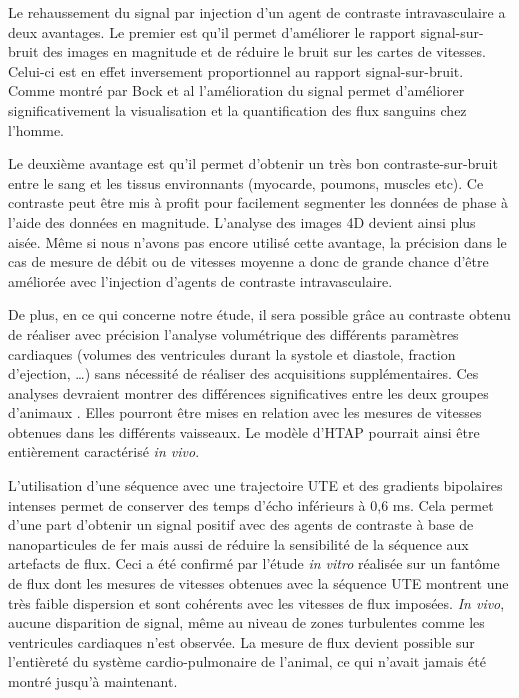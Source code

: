 Le rehaussement du signal par injection d’un agent de contraste intravasculaire a deux avantages. Le premier est qu’il permet d’améliorer le rapport signal-sur-bruit des images en magnitude et de réduire le bruit sur les cartes de vitesses. Celui-ci est en effet inversement proportionnel au rapport signal-sur-bruit. Comme montré par Bock et al \cite{Bock:2010aa} l’amélioration du signal permet d’améliorer significativement la visualisation et la quantification des flux sanguins chez l’homme.

Le deuxième avantage est qu’il permet d’obtenir un très bon contraste-sur-bruit entre le sang et les tissus environnants (myocarde, poumons, muscles etc). Ce contraste peut être mis à profit pour facilement segmenter les données de phase à l’aide des données en magnitude. L’analyse des images 4D devient ainsi plus aisée. Même si nous n’avons pas encore utilisé cette avantage, la précision dans le cas de mesure de débit ou de vitesses moyenne a donc de grande chance d’être améliorée avec l’injection d’agents de contraste intravasculaire. 

De plus, en ce qui concerne notre étude, il sera possible grâce au contraste obtenu de réaliser avec précision l’analyse volumétrique des différents paramètres cardiaques (volumes des ventricules durant la systole et diastole, fraction d’ejection, …) sans nécessité de réaliser des acquisitions supplémentaires. Ces analyses devraient montrer des différences significatives entre les deux groupes d’animaux \cite{Miraux:2009rm}. Elles pourront être mises en relation avec les mesures de vitesses obtenues dans les différents vaisseaux. Le modèle d’HTAP pourrait ainsi être entièrement caractérisé \textit{in vivo}.

L’utilisation d’une séquence avec une trajectoire UTE et des gradients bipolaires intenses permet de conserver des temps d’écho inférieurs à 0,6 ms. Cela permet d’une part d’obtenir un signal positif avec des agents de contraste à base de nanoparticules de fer mais aussi de réduire la sensibilité de la séquence aux artefacts de flux. Ceci a été confirmé par l’étude \textit{in vitro} réalisée sur un fantôme de flux dont les mesures de vitesses obtenues avec la séquence UTE montrent une très faible dispersion et sont cohérents avec les vitesses de flux imposées. \textit{In vivo}, aucune disparition de signal, même au niveau de zones turbulentes comme les ventricules cardiaques n’est observée. La mesure de flux devient possible sur l’entièreté du système cardio-pulmonaire de l’animal, ce qui n’avait jamais été montré jusqu’à maintenant.

